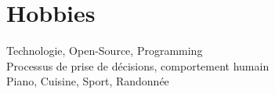 \documentclass[a4paper,10pt]{article}
\begin{document}
\section{Hobbies}
Technologie, Open-Source, Programming\\
Processus de prise de décisions, comportement humain\\
Piano, Cuisine, Sport, Randonnée


\end{document}
